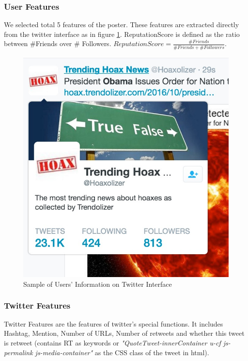 \subsubsection{User Features} We selected total 5 features of the poster. These features are extracted directly from the twitter interface as in figure \ref{fig:UserSample}. ReputationScore is defined as the ratio between \#Friends over \# Followers. $ReputationScore = \frac {\#Friends }{\#Friends +\#Followers}$.
\begin{figure}[!h]
\centering
\includegraphics[width=0.55\columnwidth]{images/UserSample.png}
\caption{Sample of Users' Information on Twitter Interface}
\label{fig:UserSample}
\end{figure}

\subsubsection{Twitter Features} Twitter Features are the features of twitter's special functions. It includes Hashtag, Mention, Number of URLs, Number of retweets and whether this tweet is retweet (contains RT as keywords or \emph{"QuoteTweet-innerContainer u-cf js-permalink js-media-container"} as the CSS class of the tweet in html).


